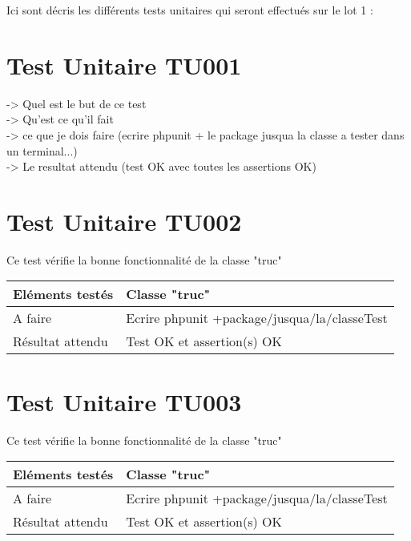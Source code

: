 Ici sont décris les différents tests unitaires qui seront effectués sur le lot 1 :

\section{Test Unitaire TU001}
	-> Quel est le but de ce test \\
	
	-> Qu'est ce qu'il fait \\
	
	-> ce que je dois faire (ecrire phpunit + le package jusqua la classe a tester dans un terminal...) \\
	
	-> Le resultat attendu (test OK avec toutes les assertions OK)
	
	
\section{Test Unitaire TU002}

Ce test vérifie la bonne fonctionnalité de la classe "truc"
  		\begin{center}
    	 		\begin{tabular}[h]{|p{}|p{}|}
			\hline
				Eléments testés & Classe "truc" \\\hline
    				A faire & Ecrire phpunit +package/jusqua/la/classeTest \\\hline
    				Résultat attendu & Test OK et assertion(s) OK \\\hline
     		\end{tabular}
  		\end{center}	
  		
  		
  		
\section{Test Unitaire TU003}

Ce test vérifie la bonne fonctionnalité de la classe "truc"
  		\begin{center}
    	 		\begin{tabular}[h]{|p{}|p{}|}
			\hline
				Eléments testés & Classe "truc" \\\hline
    				A faire & Ecrire phpunit +package/jusqua/la/classeTest \\\hline
    				Résultat attendu & Test OK et assertion(s) OK \\\hline
     		\end{tabular}
  		\end{center}	
  	
